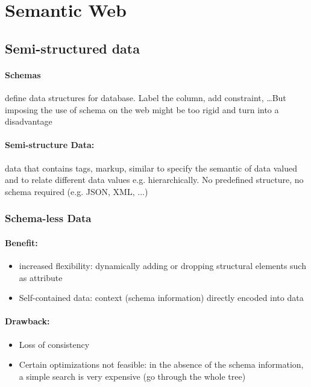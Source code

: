 \section{Semantic Web}


\subsection{Semi-structured data}

\paragraph{Schemas} define data structures for database. Label the column, add constraint,
\dots But imposing the use of schema on the web might be too rigid and turn into a disadvantage

\paragraph{Semi-structure Data:} data that contains tags, markup, similar to specify the semantic of data valued and to relate different data values e.g. hierarchically. No predefined structure, no schema required (e.g. JSON, XML, ...)

\subsubsection{Schema-less Data}

\paragraph{Benefit:}

\begin{itemize}
\item increased flexibility: dynamically adding or dropping structural elements such as attribute
\item Self-contained data: context (schema information) directly encoded into data
\end{itemize}

\paragraph{Drawback:}

\begin{itemize}
\item Loss of consistency
\item Certain optimizations not feasible: in the absence of the schema information, a simple search is very expensive (go through the whole tree)
\end{itemize}

